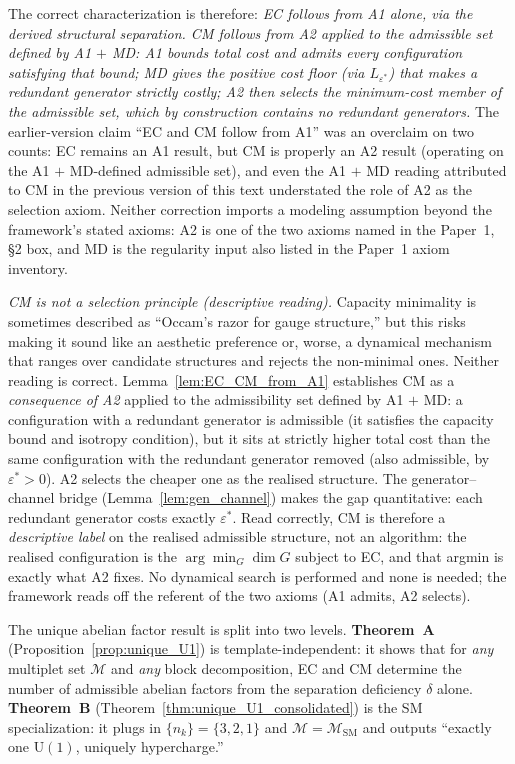 \documentclass[11pt,a4paper]{article}
\theoremstyle{definition}
\newcommand{\U}{\mathrm{U}}
\begin{document}
The correct characterization is therefore: \emph{EC follows from A1
alone, via the derived structural separation.  CM follows from A2
applied to the admissible set defined by A1 $+$ MD: A1 bounds total
cost and admits every configuration satisfying that bound; MD gives
the positive cost floor (via $L_{\varepsilon^*}$) that makes a
redundant generator strictly costly; A2 then selects the minimum-cost
member of the admissible set, which by construction contains no
redundant generators.}  The earlier-version claim ``EC and CM follow
from A1'' was an overclaim on two counts: EC remains an A1 result, but
CM is properly an A2 result (operating on the A1 $+$ MD-defined
admissible set), and even the A1 $+$ MD reading attributed to CM in
the previous version of this text understated the role of A2 as the
selection axiom.  Neither correction imports a modeling assumption
beyond the framework's stated axioms: A2 is one of the two axioms
named in the Paper~1, \S2 box, and MD is the regularity input also
listed in the Paper~1 axiom inventory.

\smallskip\noindent\textit{CM is not a selection principle (descriptive
reading).}\quad
Capacity minimality is sometimes described as ``Occam's razor for gauge
structure,'' but this risks making it sound like an aesthetic preference
or, worse, a dynamical mechanism that ranges over candidate structures
and rejects the non-minimal ones.  Neither reading is correct.
Lemma~\ref{lem:EC_CM_from_A1} establishes CM as a \emph{consequence
of A2} applied to the admissibility set defined by A1 $+$ MD: a
configuration with a redundant generator is admissible (it satisfies
the capacity bound and isotropy condition), but it sits at strictly
higher total cost than the same configuration with the redundant
generator removed (also admissible, by $\varepsilon^* > 0$).  A2
selects the cheaper one as the realised structure.  The
generator--channel bridge (Lemma~\ref{lem:gen_channel}) makes the
gap quantitative: each redundant generator costs exactly
$\varepsilon^*$.  Read correctly, CM is therefore a \emph{descriptive
label} on the realised admissible structure, not an algorithm: the
realised configuration is the $\arg\min_G \dim G$ subject to EC, and
that argmin is exactly what A2 fixes.  No dynamical search is
performed and none is needed; the framework reads off the referent
of the two axioms (A1 admits, A2 selects).

\smallskip\noindent The unique abelian factor result is split into two
levels.  \textbf{Theorem~A} (Proposition~\ref{prop:unique_U1}) is
template-independent: it shows that for \emph{any} multiplet set
$\mathcal{M}$ and \emph{any} block decomposition, EC and CM determine
the number of admissible abelian factors from the separation deficiency
$\delta$ alone.  \textbf{Theorem~B}
(Theorem~\ref{thm:unique_U1_consolidated}) is the SM specialization:
it plugs in $\{n_k\} = \{3, 2, 1\}$ and $\mathcal{M} =
\mathcal{M}_{\mathrm{SM}}$ and outputs ``exactly one $\U(1)$,
uniquely hypercharge.''
\end{document}
